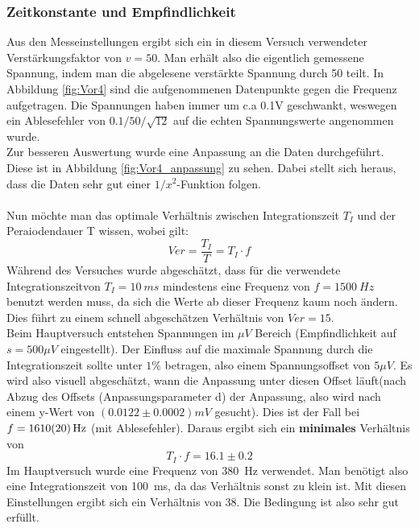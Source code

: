 \documentclass[12pt,a4paper]{article}
\begin{document}
\subsubsection{Zeitkonstante und Empfindlichkeit}
Aus den Messeinstellungen ergibt sich ein in diesem Versuch verwendeter Verstärkungsfaktor von $v = 50$. Man erhält also die eigentlich gemessene Spannung, indem man die abgelesene verstärkte Spannung durch 50 teilt. In Abbildung \ref{fig:Vor4} sind die aufgenommenen Datenpunkte gegen die Frequenz aufgetragen. Die Spannungen haben immer um c.a 0.1V geschwankt, weswegen ein Ablesefehler von $0.1/50/\sqrt{12}$ auf die echten Spannungswerte angenommen wurde.\\
Zur besseren Auswertung wurde eine Anpassung an die Daten durchgeführt. Diese ist in Abbildung \ref{fig:Vor4_anpassung} zu sehen. Dabei stellt sich heraus, dass die Daten sehr gut einer $1/x^2$-Funktion folgen.\\
\\
Nun möchte man das optimale Verhältnis zwischen Integrationszeit $T_I$ und der Peraiodendauer T wissen, wobei gilt:
\begin{equation}
Ver = \dfrac{T_I}{T} = T_I \cdot f
\end{equation}
Während des Versuches wurde abgeschätzt, dass für die verwendete Integrationszeitvon $T_I = \SI{10}{ms}$ mindestens eine Frequenz von $f = \SI{1500}{Hz}$ benutzt werden muss, da sich die Werte ab dieser Frequenz kaum noch ändern. Dies führt zu einem schnell abgeschätzen Verhältnis von $Ver = 15$.\\
Beim Hauptversuch entstehen Spannungen im $\si{\mu V}$ Bereich (Empfindlichkeit auf $s = 500\mu V$ eingestellt). Der Einfluss auf die maximale Spannung durch die Integrationszeit sollte unter $1\%$ betragen, also einem Spannungsoffset von $5\mu V$. Es wird also visuell abgeschätzt, wann die Anpassung unter diesen Offset läuft(nach Abzug des Offsets (Anpassungsparameter d) der Anpassung, also wird nach einem y-Wert von $(0.0122\pm 0.0002)mV$ gesucht).  Dies ist der Fall bei $f = \SI{1610\pm 20}{Hz}$ (mit Ablesefehler). Daraus ergibt sich ein \textbf{minimales} Verhältnis von
\begin{equation*}
\boxed{T_I \cdot f = 16.1\pm 0.2}
\end{equation*}
Im Hauptversuch wurde eine Frequenz von \SI{380}{Hz} verwendet. Man benötigt also eine Integrationszeit von \SI{100}{ms}, da das Verhältnis sonst zu klein ist. Mit diesen Einstellungen ergibt sich ein Verhältnis von 
$38$. Die Bedingung ist also sehr gut erfüllt.
\end{document}
